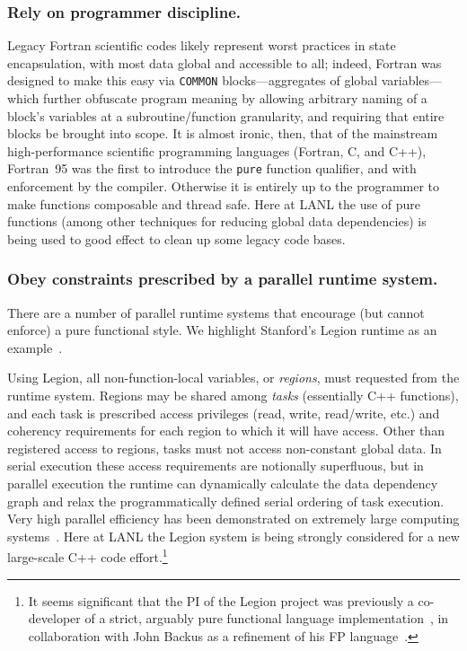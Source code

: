 \documentclass{llncs}
\begin{document}
\subsubsection{Rely on programmer discipline.}
Legacy Fortran scientific codes likely represent worst practices in state
encapsulation, with most data global and accessible to all; indeed, Fortran
was designed to make this easy via \texttt{COMMON} blocks---aggregates of
global variables---which further obfuscate program meaning by allowing
arbitrary naming of a block's variables at a subroutine/function granularity,
and requiring that entire blocks be brought into scope.  It is almost ironic,
then, that of the mainstream high-performance scientific programming languages
(Fortran, C, and C++), Fortran~95 was the first to introduce the \texttt{pure}
function qualifier, and with enforcement by the compiler.  Otherwise it is
entirely up to the programmer to make functions composable and thread safe.
Here at LANL the use of pure functions (among other techniques for reducing
global data dependencies) is being used to good effect to clean up some legacy
code bases.

\subsubsection{Obey constraints prescribed by a parallel runtime system.}
There are a number of parallel runtime systems that encourage (but cannot
enforce) a pure functional style.  We highlight Stanford's Legion
runtime as an example~\cite{Bauer12}.

Using Legion, all non-function-local variables, or \emph{regions}, must
requested from the runtime system.  Regions may be shared among \emph{tasks}
(essentially C++ functions), and each task is prescribed access privileges
(read, write, read/write, etc.) and coherency requirements for each region to
which it will have access.  Other than registered access to regions, tasks
must not access non-constant global data.  In serial execution these access
requirements are notionally superfluous, but in parallel execution the runtime
can dynamically calculate the data dependency graph and relax the
programmatically defined serial ordering of task execution.  Very high
parallel efficiency has been demonstrated on extremely large computing
systems~\cite{Bauer14}.  Here at LANL the Legion system is being strongly
considered for a new large-scale C++ code effort.\footnote{It seems
  significant that the PI of the Legion project was previously a co-developer
  of a strict, arguably pure functional language
  implementation~\cite{AikenFL,FLreport89}, in collaboration with John Backus
  as a refinement of his FP language~\cite{Backus:1978}.}
\end{document}
